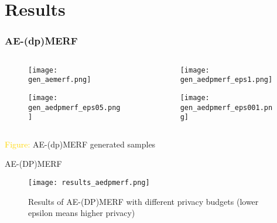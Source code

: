 \section{Results}

\begin{frame}
    \frametitle{AE-(dp)MERF}

    \begin{columns}
        \begin{column}{0.48\textwidth}
        \begin{figure}
            \centering
            \texttt{[image: gen\_aemerf.png]}
        \end{figure}
        \begin{figure}[h]
            \centering
            \texttt{[image: gen\_aedpmerf\_eps05.png]}
        \end{figure}
    \end{column}
    \begin{column}{0.48\textwidth}
        \begin{figure}
            \centering
            \texttt{[image: gen\_aedpmerf\_eps1.png]}
        \end{figure}
        \begin{figure}[h]
            \centering
            \texttt{[image: gen\_aedpmerf\_eps001.png]}
        \end{figure}
    \end{column}
    
    \end{columns}
    \centering
    \textcolor{gold}{Figure:} AE-(dp)MERF generated samples

\end{frame}

\begin{frame}{AE-(DP)MERF}
    \begin{figure}
        \centering
        \texttt{[image: results\_aedpmerf.png]}
        \caption{Results of AE-(DP)MERF with different privacy budgets (lower epsilon means higher privacy)}
        \label{fig:enter-label}
    \end{figure}
\end{frame}

